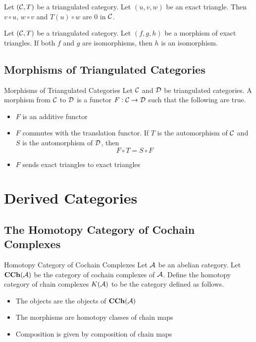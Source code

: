 \documentclass[a4paper]{article}
\begin{document}
\begin{lmm}{}{} Let $(\mathcal{C},T)$ be a triangulated category. Let $(u,v,w)$ be an exact triangle. Then $v\circ u$, $w\circ v$ and $T(u)\circ w$ are $0$ in $\mathcal{C}$. 
\end{lmm}

\begin{lmm}{}{} Let $(\mathcal{C},T)$ be a triangulated category. Let $(f,g,h)$ be a morphism of exact triangles. If both $f$ and $g$ are isomorphisms, then $h$ is an isomorphism. 
\end{lmm}

\subsection{Morphisms of Triangulated Categories}
\begin{defn}{Morphisms of Triangulated Categories}{} Let $\mathcal{C}$ and $\mathcal{D}$ be triangulated categories. A morphism from $\mathcal{C}$ to $\mathcal{D}$ is a functor $F:\mathcal{C}\to\mathcal{D}$ such that the following are true. 
\begin{itemize}
\item $F$ is an additive functor
\item $F$ commutes with the translation functor. If $T$ is the automorphism of $\mathcal{C}$ and $S$ is the automorphism of $\mathcal{D}$, then $$F\circ T=S\circ F$$
\item $F$ sends exact triangles to exact triangles
\end{itemize}
\end{defn}

\pagebreak
\section{Derived Categories}
\subsection{The Homotopy Category of Cochain Complexes}
\begin{defn}{Homotopy Category of Cochain Complexes}{} Let $\mathcal{A}$ be an abelian category. Let $\bold{CCh}(\mathcal{A})$ be the category of cochain complexes of $\mathcal{A}$. Define the homotopy category of chain complexes $K(\mathcal{A})$ to be the category defined as follows. 
\begin{itemize}
\item The objects are the objects of $\bold{CCh}(\mathcal{A})$
\item The morphisms are homotopy classes of chain maps
\item Composition is given by composition of chain maps
\end{itemize}
\end{defn}
\end{document}

